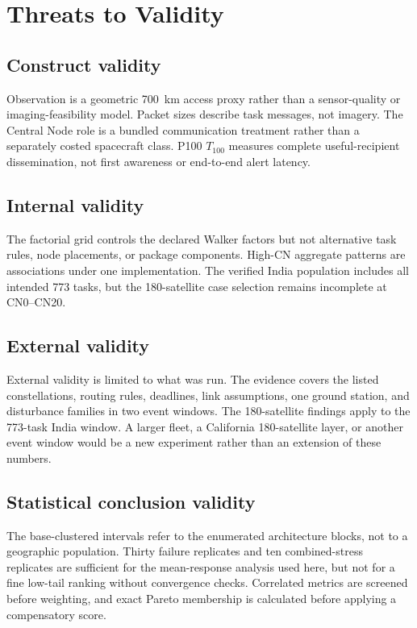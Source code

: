 \section{Threats to Validity}

\subsection{Construct validity}

Observation is a geometric \SI{700}{\kilo\metre} access proxy rather than a sensor-quality or imaging-feasibility model. Packet sizes describe task messages, not imagery. The Central Node role is a bundled communication treatment rather than a separately costed spacecraft class. P100 $T_{100}$ measures complete useful-recipient dissemination, not first awareness or end-to-end alert latency.

\subsection{Internal validity}

The factorial grid controls the declared Walker factors but not alternative task rules, node placements, or package components. High-CN aggregate patterns are associations under one implementation. The verified India population includes all intended 773 tasks, but the 180-satellite case selection remains incomplete at CN0--CN20.

\subsection{External validity}

External validity is limited to what was run. The evidence covers the listed constellations, routing rules, deadlines, link assumptions, one ground station, and disturbance families in two event windows. The 180-satellite findings apply to the 773-task India window. A larger fleet, a California 180-satellite layer, or another event window would be a new experiment rather than an extension of these numbers.

\subsection{Statistical conclusion validity}

The base-clustered intervals refer to the enumerated architecture blocks, not to a geographic population. Thirty failure replicates and ten combined-stress replicates are sufficient for the mean-response analysis used here, but not for a fine low-tail ranking without convergence checks. Correlated metrics are screened before weighting, and exact Pareto membership is calculated before applying a compensatory score.

